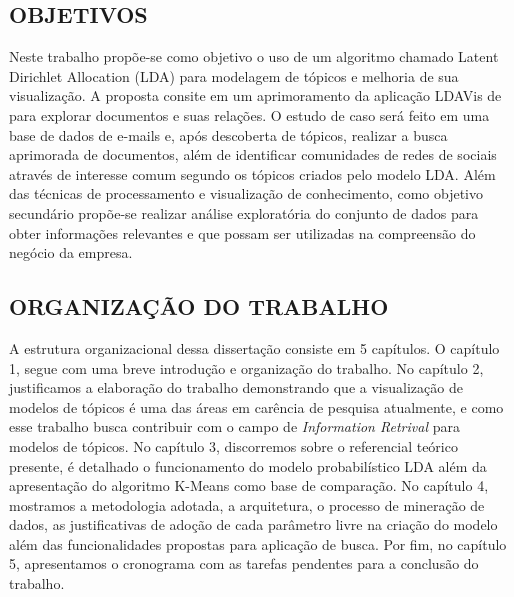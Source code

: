 \documentclass[12pt,a4paper]{article}
\begin{document}
\subsection{OBJETIVOS}

Neste trabalho propõe-se como objetivo o uso de um algoritmo chamado Latent Dirichlet Allocation (LDA) \cite{blei2003latent} para modelagem de tópicos e melhoria de sua visualização. A proposta consite em um aprimoramento da aplicação LDAVis de  para explorar documentos e suas relações. O estudo de caso será feito em uma base de dados de e-mails e, após descoberta de tópicos, realizar a busca aprimorada de documentos, além de identificar  comunidades de redes de sociais através de interesse comum segundo os tópicos criados pelo modelo LDA. Além das técnicas de processamento e visualização de conhecimento, como objetivo secundário propõe-se realizar análise exploratória do conjunto de dados para obter informações relevantes e que possam ser utilizadas na compreensão do negócio da empresa.


\subsection{ORGANIZAÇÃO DO TRABALHO}

 A estrutura organizacional dessa dissertação consiste em 5 capítulos. O capítulo 1, segue com uma breve introdução e organização do trabalho. 
  No capítulo 2, justificamos a elaboração do trabalho demonstrando que a visualização de modelos de tópicos é uma das áreas em carência de pesquisa atualmente, 
  e como esse trabalho busca contribuir com o campo de \textit{Information Retrival} para modelos de tópicos. No capítulo 3, discorremos sobre o referencial teórico presente, 
  é detalhado o funcionamento do modelo probabilístico LDA além da apresentação do algoritmo K-Means como base de comparação. No capítulo 4, mostramos a metodologia adotada, 
  a arquitetura, o processo de mineração de dados, as justificativas de adoção de cada parâmetro livre na criação do modelo além das funcionalidades propostas para
  aplicação de busca. Por fim, no capítulo 5, apresentamos o cronograma com as tarefas pendentes para a conclusão do trabalho.




\end{document}
